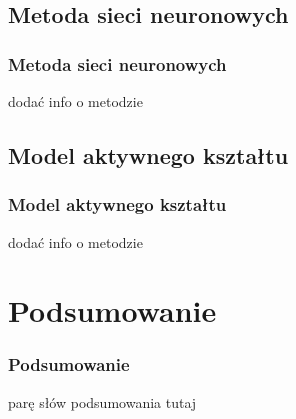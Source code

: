 \documentclass[xcolor=table]{beamer}
\begin{document}
\subsection{Metoda sieci neuronowych}
\begin{frame}
  \frametitle{Metoda sieci neuronowych}

  dodać info o metodzie

\end{frame}

\subsection{Model aktywnego kształtu}
\begin{frame}
  \frametitle{Model aktywnego kształtu}

  dodać info o metodzie

\end{frame}


\section{Podsumowanie}

\begin{frame}[fragile]
  \frametitle{Podsumowanie}

  parę słów podsumowania tutaj
  
\end{frame}
\end{document}
